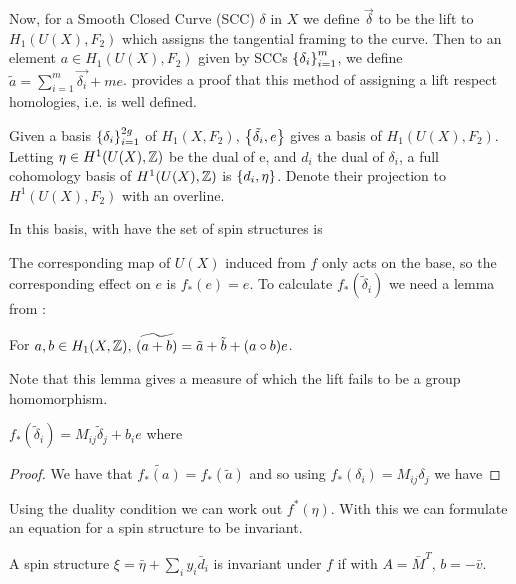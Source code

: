 \documentclass{article}
\begin{document}
Now, for a Smooth Closed Curve (SCC) $\delta$ in $X$ we define $\overrightarrow{\delta}$ to be the lift to $H_1(U(X), F_2)$ which assigns the tangential framing to the curve. Then to an element $a \in H_1(U(X), F_2)$ given by SCCs $\left\{ \delta_i \right\}_{i=1}^m$, we define $\tilde{a} = \sum_{i=1}^m \overrightarrow{\delta_i} + me$. \cite{Johnson1980} provides a proof that this method of assigning a lift respect homologies, i.e. is well defined. 

Given a basis $\left\{ \delta_i \right\}_{i=1}^{2g}$ of $H_1(X, F_2)$, $\left\{ \tilde{\delta_i}, e \right\}$ gives a basis of $H_1(U(X), F_2)$. Letting $\eta \in H^1(U(X),\mathbb{Z})$ be the dual of e, and $d_i$ the dual of $\delta_i$, a full cohomology basis of $H^1(U(X),\mathbb{Z})$ is $\left\{ d_i,\eta \right\}$. Denote their projection to $H^1(U(X),F_2)$ with an overline. 
\begin{remark}
	In this basis, with have the set of spin structures is 
\end{remark}
The corresponding map of $U(X)$ induced from $f$ only acts on the base, so the corresponding effect on $e$ is $f_\ast(e)=e$. 
To calculate $f_\ast(\tilde{\delta}_i)$ we need a lemma from \cite{Johnson1980}:
\begin{lemma}\label{lemma: spin structure homology lift is not a homomorphism}
	For $a,b \in H_1(X,\mathbb{Z}), \, \widetilde{(a+b)} = \tilde{a} + \tilde{b} + (a \circ b)e$. 
\end{lemma}
Note that this lemma gives a measure of which the lift fails to be a group homomorphism. 



\begin{corollary}
	$f_\ast(\widetilde{\delta}_i) = M_{ij} \tilde{\delta}_j + b_i e$ where 
\end{corollary}
\begin{proof}
	We have that $\widetilde{f_\ast(a)} = f_\ast(\tilde{a})$ and so using $f_\ast(\delta_i) = M_{ij} \delta_j$ we have 
\end{proof}
Using the duality condition we can work out $f^\ast(\eta)$. With this we can formulate an equation for a spin structure to be invariant. 
\begin{theorem}
	A spin structure $\xi = \bar{\eta} + \sum_i y_i \bar{d}_i$ is invariant under $f$ if 
with $A=\bar{M}^T, \, b=-\bar{v}$.   
\end{theorem}
\end{document}
